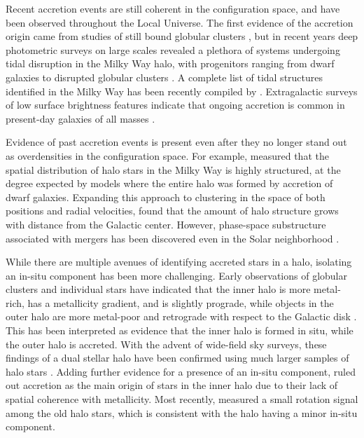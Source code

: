 \documentclass[apj, twocolappendix, numberedappendix, appendixfloats]{emulateapj}
\begin{document}
Recent accretion events are still coherent in the configuration space, and have been observed throughout the Local Universe. 
The first evidence of the accretion origin came from studies of still bound globular clusters \citep{sz}, but in recent years deep photometric surveys on large scales revealed a plethora of systems undergoing tidal disruption in the Milky Way halo, with progenitors ranging from dwarf galaxies \citep[e.g.,][]{ibata1994, belokurov2007a, belokurov2007b, juric2008, bonaca2012a} to disrupted globular clusters \citep[e.g.,][]{rockosi2002, grillmair2006, grillmair2009, bonaca2012b, bernard2016}.
A complete list of tidal structures identified in the Milky Way has been recently compiled by \citet{grillmair2016}.
Extragalactic surveys of low surface brightness features indicate that ongoing accretion is common in present-day galaxies of all masses \citep{ibata2001, ferguson2002, martinez-delgado2010, martinez-delgado2012, romanowsky2012, crnojevic2016}.

Evidence of past accretion events is present even after they no longer stand out as overdensities in the configuration space.
For example, \citet{bell2008} measured that the spatial distribution of halo stars in the Milky Way is highly structured, at the degree expected by models where the entire halo was formed by accretion of dwarf galaxies.
Expanding this approach to clustering in the space of both positions and radial velocities, \citet{janesh2016} found that the amount of halo structure grows with distance from the Galactic center.
However, phase-space substructure associated with mergers has been discovered even in the Solar neighborhood \citep{helmi1999,smith2009,helmi2017}.

While there are multiple avenues of identifying accreted stars in a halo, isolating an in-situ component has been more challenging.
Early observations of globular clusters and individual stars have indicated that the inner halo is more metal-rich, has a metallicity gradient, and is slightly prograde, while objects in the outer halo are more metal-poor and retrograde with respect to the Galactic disk \citep[e.g.,][]{sz}.
This has been interpreted as evidence that the inner halo is formed in situ, while the outer halo is accreted.
With the advent of wide-field sky surveys, these findings of a dual stellar halo have been confirmed using much larger samples of halo stars \citep{carollo2007, carollo2010, beers2012}.
Adding further evidence for a presence of an in-situ component, \citet{schlaufman2012} ruled out accretion as the main origin of stars in the inner halo due to their lack of spatial coherence with metallicity.
Most recently, \citet{deason2017} measured a small rotation signal among the old halo stars, which is consistent with the halo having a minor in-situ component.
\end{document}

